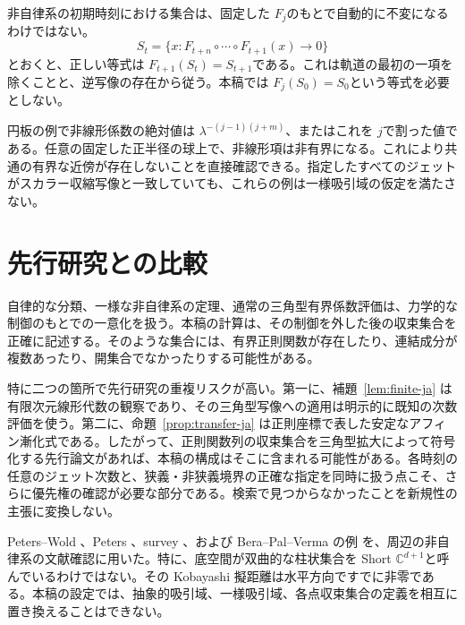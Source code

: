 \documentclass[12pt]{amsart}
\theoremstyle{definition}
\theoremstyle{remark}
\numberwithin{equation}{section}
\newcommand{\C}{\mathbb{C}}
\begin{document}
非自律系の初期時刻における集合は、固定した \allowbreak$F_j$\allowbreak のもとで自動的に不変になるわけではない。
\[
S_t=\{x:F_{t+n}\circ\cdots\circ F_{t+1}(x)\to0\}
\]
とおくと、正しい等式は \allowbreak$F_{t+1}(S_t)=S_{t+1}$\allowbreak である。これは軌道の最初の一項を除くことと、逆写像の存在から従う。本稿では \allowbreak$F_j(S_0)=S_0$\allowbreak という等式を必要としない。

円板の例で非線形係数の絶対値は \allowbreak$\lambda^{-(j-1)(j+m)}$\allowbreak、またはこれを \allowbreak$j$\allowbreak で割った値である。任意の固定した正半径の球上で、非線形項は非有界になる。これにより共通の有界な近傍が存在しないことを直接確認できる。指定したすべてのジェットがスカラー収縮写像と一致していても、これらの例は一様吸引域の仮定を満たさない。

\section{先行研究との比較}
自律的な分類、一様な非自律系の定理、通常の三角型有界係数評価は、力学的な制御のもとでの一意化を扱う。本稿の計算は、その制御を外した後の収束集合を正確に記述する。そのような集合には、有界正則関数が存在したり、連結成分が複数あったり、開集合でなかったりする可能性がある。

特に二つの箇所で先行研究の重複リスクが高い。第一に、補題~\ref{lem:finite-ja} は有限次元線形代数の観察であり、その三角型写像への適用は明示的に既知の次数評価を使う。第二に、命題~\ref{prop:transfer-ja} は正則座標で表した安定なアフィン漸化式である。したがって、正則関数列の収束集合を三角型拡大によって符号化する先行論文があれば、本稿の構成はそこに含まれる可能性がある。各時刻の任意のジェット次数と、狭義・非狭義境界の正確な指定を同時に扱う点こそ、さらに優先権の確認が必要な部分である。検索で見つからなかったことを新規性の主張に変換しない。

Peters--Wold \cite{PW-ja}、Peters \cite{Peters-ja}、survey \cite{Survey-ja}、および Bera--Pal--Verma の例 \cite{BPV-ja} を、周辺の非自律系の文献確認に用いた。特に、底空間が双曲的な柱状集合を Short \allowbreak$\C^{d+1}$\allowbreak と呼んでいるわけではない。その Kobayashi 擬距離は水平方向ですでに非零である。本稿の設定では、抽象的吸引域、一様吸引域、各点収束集合の定義を相互に置き換えることはできない。
\end{document}
